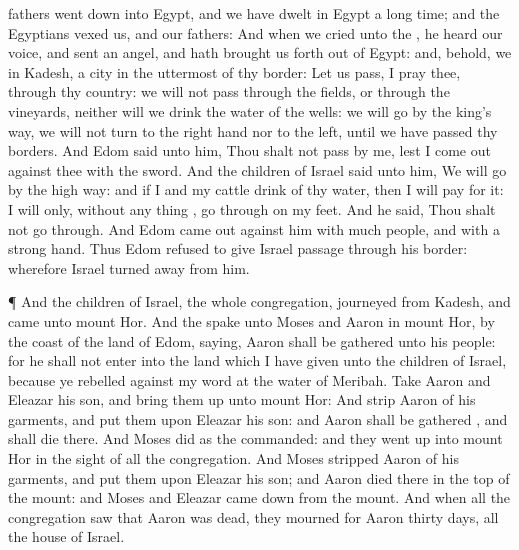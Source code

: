 {fathers went
down into
Egypt, and we have
dwelt in
Egypt a
long
time; and the
Egyptians
vexed us, and our
fathers:
And when we
cried unto the
{}, he
heard our
voice, and
sent an
angel, and hath brought us
forth out of
Egypt: and, behold, we
{} in
Kadesh, a
city in the
uttermost of thy
border:
Let us
pass, I pray thee, through thy
country: we will not
pass through the
fields, or through the
vineyards, neither will we
drink
{} the
water of the
wells: we will
go by the
king’s
{}
way, we will not
turn to the right
hand nor to the
left, until we have
passed thy
borders.
And
Edom
said unto him, Thou shalt not
pass by me, lest I come
out
against thee with the
sword.
And the
children of
Israel
said unto him, We will
go by the high
way: and if I and my
cattle
drink of thy
water, then I will
pay for it: I will only, without
{} any
thing
{}, go
through on my
feet.
And he
said, Thou shalt not go
through. And
Edom came
out
against him with
much
people, and with a
strong
hand.
Thus
Edom
refused to
give
Israel
passage through his
border: wherefore
Israel turned
away from him.
\par }{\PP {}¶ And the
children of
Israel,
{} the whole
congregation,
journeyed from
Kadesh, and
came unto
mount
Hor.
And the
{}
spake unto
Moses and
Aaron in
mount
Hor, by the
coast of the
land of
Edom,
saying,
Aaron shall be
gathered unto his
people: for he shall not
enter into the
land which I have
given unto the
children of
Israel, because ye rebelled
against my
word at the
water of
Meribah.
Take
Aaron and
Eleazar his
son, and bring them
up unto
mount
Hor:
And
strip
Aaron of his
garments, and
put them upon
Eleazar his
son: and
Aaron shall be
gathered
{}, and shall
die there.
And
Moses
did as the
{}
commanded: and they went
up into
mount
Hor in the
sight of all the
congregation.
And
Moses
stripped
Aaron of his
garments, and
put them upon
Eleazar his
son; and
Aaron
died there in the
top of the
mount: and
Moses and
Eleazar came
down from the
mount.
And when all the
congregation
saw that
Aaron was
dead, they
mourned for
Aaron
thirty
days,
{} all the
house of
Israel.

}
